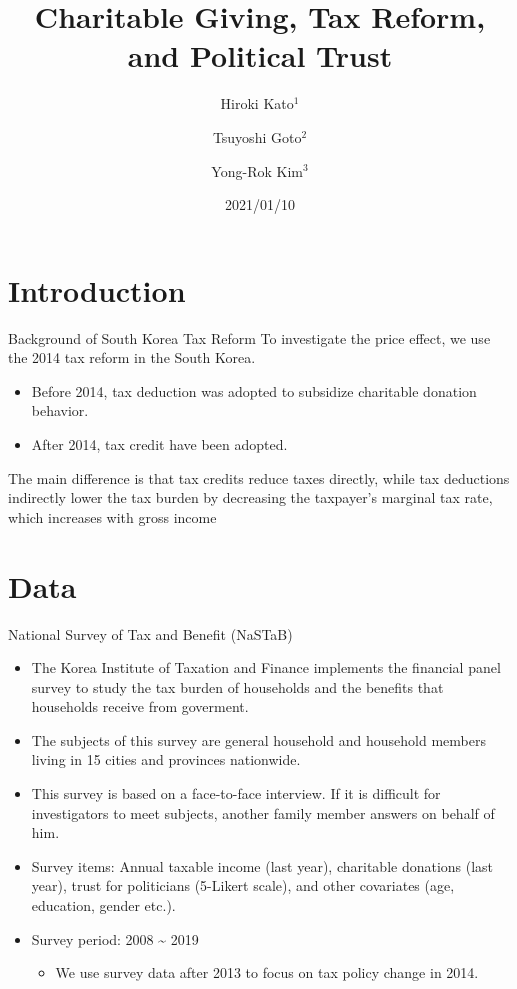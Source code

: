 \documentclass[
  ignorenonframetext,
]{beamer}
\title{Charitable Giving, Tax Reform, and Political Trust}
\author{Hiroki Kato\(^1\) \and Tsuyoshi Goto\(^2\) \and Yong-Rok
Kim\(^3\)}
\date{2021/01/10}
\institute{\(^1\)Osaka University \and \(^2\)Chiba
University \and \(^3\)Kobe University}
\providecommand{\tightlist}{%
  \setlength{\itemsep}{0pt}\setlength{\parskip}{0pt}}
\begin{document}
\frame{\titlepage}

\hypertarget{introduction}{%
\section{Introduction}\label{introduction}}

\begin{frame}{Background of South Korea Tax Reform}
\protect\hypertarget{background-of-south-korea-tax-reform}{}
To investigate the price effect, we use the 2014 tax reform in the South
Korea.

\begin{itemize}
\tightlist
\item
  Before 2014, tax deduction was adopted to subsidize charitable
  donation behavior.
\item
  After 2014, tax credit have been adopted.
\end{itemize}

The main difference is that tax credits reduce taxes directly, while tax
deductions indirectly lower the tax burden by decreasing the taxpayer's
marginal tax rate, which increases with gross income
\end{frame}

\hypertarget{data}{%
\section{Data}\label{data}}

\begin{frame}{National Survey of Tax and Benefit (NaSTaB)}
\protect\hypertarget{national-survey-of-tax-and-benefit-nastab}{}
\begin{itemize}
\tightlist
\item
  The Korea Institute of Taxation and Finance implements the financial
  panel survey to study the tax burden of households and the benefits
  that households receive from goverment.
\item
  The subjects of this survey are general household and household
  members living in 15 cities and provinces nationwide.
\item
  This survey is based on a face-to-face interview. If it is difficult
  for investigators to meet subjects, another family member answers on
  behalf of him.
\item
  Survey items: Annual taxable income (last year), charitable donations
  (last year), trust for politicians (5-Likert scale), and other
  covariates (age, education, gender etc.).
\item
  Survey period: 2008 \textasciitilde{} 2019

  \begin{itemize}
  \tightlist
  \item
    We use survey data after 2013 to focus on tax policy change in 2014.
  \end{itemize}
\end{itemize}
\end{frame}
\end{document}
